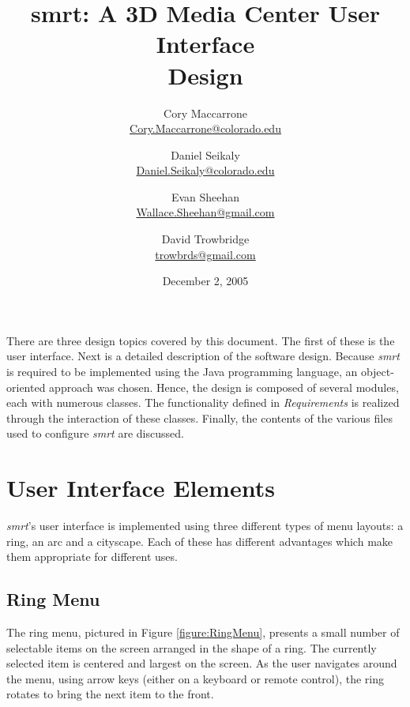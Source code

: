 \documentclass[letterpaper, titlepage, 11pt]{article}
\title{
	smrt: A 3D Media Center User Interface
	\\
	Design
}
\author{
	Cory Maccarrone  \\ {\small \href{mailto:Cory.Maccarrone@colorado.edu}{Cory.Maccarrone@colorado.edu}}
	\and
	Daniel Seikaly   \\ {\small \href{mailto:Daniel.Seikaly@colorado.edu}{Daniel.Seikaly@colorado.edu}}
	\and
	Evan Sheehan     \\ {\small \href{mailto:Wallace.Sheehan@gmail.com}{Wallace.Sheehan@gmail.com}}
	\and
	David Trowbridge \\ {\small \href{mailto:trowbrds@gmail.com}{trowbrds@gmail.com}}
}
\date{December 2, 2005}
\begin{document}
\maketitle

\raggedbottom


\hspace{1em}
\pagebreak

\tableofcontents

\pagebreak
\hspace{1em}
\pagebreak

\listoffigures
\pagebreak

\hspace{1em}
\pagebreak




There are three design topics covered by this document.  The first of these is
the user interface.  Next is a detailed description of the software design.
Because \textit{smrt} is required to be implemented using the Java programming
language, an object-oriented approach was chosen.  Hence, the design is
composed of several modules, each with numerous classes.  The functionality
defined in \textit{Requirements} is realized through the interaction of these
classes.  Finally, the contents of the various files used to configure
\textit{smrt} are discussed.

\section{User Interface Elements}
\label{UIElements}
\textit{smrt}'s user interface is implemented using three different types
of menu layouts: a ring, an arc and a cityscape.  Each of these has different
advantages which make them appropriate for different uses.

\subsection{Ring Menu}
The ring menu, pictured in Figure \ref{figure:RingMenu}, presents a small
number of selectable items on the screen arranged in the shape of a ring.  The
currently selected item is centered and largest on the screen.  As the user
navigates around the menu, using arrow keys (either on a keyboard or remote
control), the ring rotates to bring the next item to the front.
\end{document}
